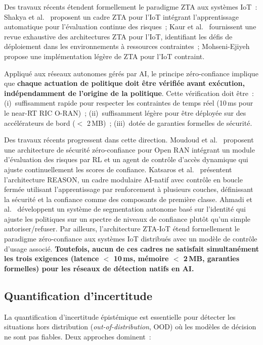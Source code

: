 Des travaux récents étendent formellement le paradigme ZTA aux systèmes IoT~: Shakya et al.~\cite{shakya_zt_iot2025} proposent un cadre ZTA pour l'IoT intégrant l'apprentissage automatique pour l'évaluation continue des risques~; Kaur et al.~\cite{kaur_zta_iot2024} fournissent une revue exhaustive des architectures ZTA pour l'IoT, identifiant les défis de déploiement dans les environnements à ressources contraintes~; Mohseni-Ejiyeh~\cite{mohseni_zt_iot2023} propose une implémentation légère de ZTA pour l'IoT contraint.

Appliqué aux réseaux autonomes gérés par AI, le principe zéro-confiance implique que \textbf{chaque actuation de politique doit être vérifiée avant exécution, indépendamment de l'origine de la politique}. Cette vérification doit être~: (i)~suffisamment rapide pour respecter les contraintes de temps réel (10\,ms pour le near-RT RIC O-RAN)~; (ii)~suffisamment légère pour être déployée sur des accélérateurs de bord ($<$ 2\,MB)~; (iii)~dotée de garanties formelles de sécurité.

Des travaux récents progressent dans cette direction. Moudoud et al.\ \cite{moudoud2025oran_zt} proposent une architecture de sécurité zéro-confiance pour Open RAN intégrant un module d'évaluation des risques par RL et un agent de contrôle d'accès dynamique qui ajuste continuellement les scores de confiance. Katsaros et al.\ \cite{katsaros2024reason} présentent l'architecture REASON, un cadre modulaire AI-natif avec contrôle en boucle fermée utilisant l'apprentissage par renforcement à plusieurs couches, définissant la sécurité et la confiance comme des composants de première classe. Ahmadi et al.\ \cite{ahmadi2025zt_segmentation} développent un système de segmentation autonome basé sur l'identité qui ajuste les politiques sur un spectre de niveaux de confiance plutôt qu'un simple autoriser/refuser. Par ailleurs, l'architecture ZTA-IoT \cite{ztaiot_acm2025} étend formellement le paradigme zéro-confiance aux systèmes IoT distribués avec un modèle de contrôle d'usage associé. \textbf{Toutefois, aucun de ces cadres ne satisfait simultanément les trois exigences (latence $<$ 10\,ms, mémoire $<$ 2\,MB, garanties formelles) pour les réseaux de détection natifs en AI.}

\subsection{Quantification d'incertitude}

La quantification d'incertitude épistémique est essentielle pour détecter les situations hors distribution (\emph{out-of-distribution}, OOD) où les modèles de décision ne sont pas fiables. Deux approches dominent~:

